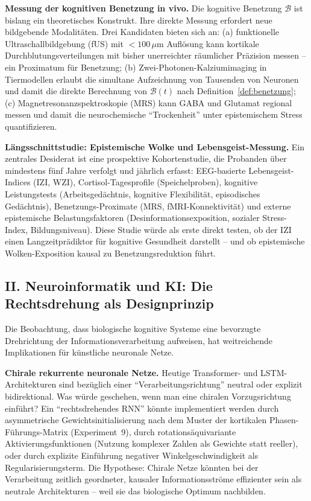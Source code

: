 ﻿\documentclass[12pt,a4paper]{report}
\theoremstyle{plain}
\theoremstyle{definition}
\theoremstyle{remark}
\begin{document}
	\textbf{Messung der kognitiven Benetzung in vivo.}
	Die kognitive Benetzung $\mathcal{B}$ ist bislang ein theoretisches
	Konstrukt. Ihre direkte Messung erfordert neue bildgebende Modalitäten.
	Drei Kandidaten bieten sich an: (a) funktionelle Ultraschallbildgebung
	(fUS) mit $< 100\,\mu\mathrm{m}$ Auflösung kann kortikale
	Durchblutungsverteilungen mit bisher unerreichter räumlicher Präzision
	messen -- ein Proximatum für Benetzung; (b) Zwei-Photonen-Kalziumimaging
	in Tiermodellen erlaubt die simultane Aufzeichnung von
	Tausenden von Neuronen und damit die direkte Berechnung von
	$\mathcal{B}(t)$ nach Definition~\ref{def:benetzung};
	(c) Magnetresonanzspektroskopie (MRS) kann GABA und Glutamat
	regional messen und damit die neurochemische ``Trockenheit''
	unter epistemischem Stress quantifizieren.

	\textbf{Längsschnittstudie: Epistemische Wolke und Lebensgeist-Messung.}
	Ein zentrales Desiderat ist eine prospektive Kohortenstudie,
	die Probanden über mindestens fünf Jahre verfolgt und
	jährlich erfasst: EEG-basierte Lebensgeist-Indices (IZI, WZI),
	Cortisol-Tagesprofile (Speichelproben), kognitive Leistungstests
	(Arbeitsgedächtnis, kognitive Flexibilität, episodisches Gedächtnis),
	Benetzungs-Proximate (MRS, fMRI-Konnektivität) und
	externe epistemische Belastungsfaktoren (Desinformationsexposition,
	sozialer Stress-Index, Bildungsniveau).
	Diese Studie würde als erste direkt testen, ob der IZI einen
	Langzeitprädiktor für kognitive Gesundheit darstellt -- und ob
	epistemische Wolken-Exposition kausal zu Benetzungsreduktion führt.

	\subsection*{II. Neuroinformatik und KI: Die Rechtsdrehung als
		Designprinzip}

	Die Beobachtung, dass biologische kognitive Systeme eine
	bevorzugte Drehrichtung der Informationsverarbeitung aufweisen,
	hat weitreichende Implikationen für künstliche neuronale Netze.

	\textbf{Chirale rekurrente neuronale Netze.}
	Heutige Transformer- und LSTM-Architekturen sind bezüglich einer
	``Verarbeitungsrichtung'' neutral oder explizit bidirektional.
	Was würde geschehen, wenn man eine chiralen Vorzugsrichtung
	einführt? Ein ``rechtsdrehendes RNN'' könnte implementiert werden
	durch asymmetrische Gewichtsinitialisierung nach dem Muster
	der kortikalen Phasen-Führungs-Matrix (Experiment~9),
	durch rotationsäquivariante Aktivierungsfunktionen
	(Nutzung komplexer Zahlen als Gewichte statt reeller),
	oder durch explizite Einführung negativer Winkelgeschwindigkeit
	als Regularisierungsterm.
	Die Hypothese: Chirale Netze könnten bei der Verarbeitung
	zeitlich geordneter, kausaler Informationsströme effizienter
	sein als neutrale Architekturen -- weil sie das biologische
	Optimum nachbilden.
\end{document}
